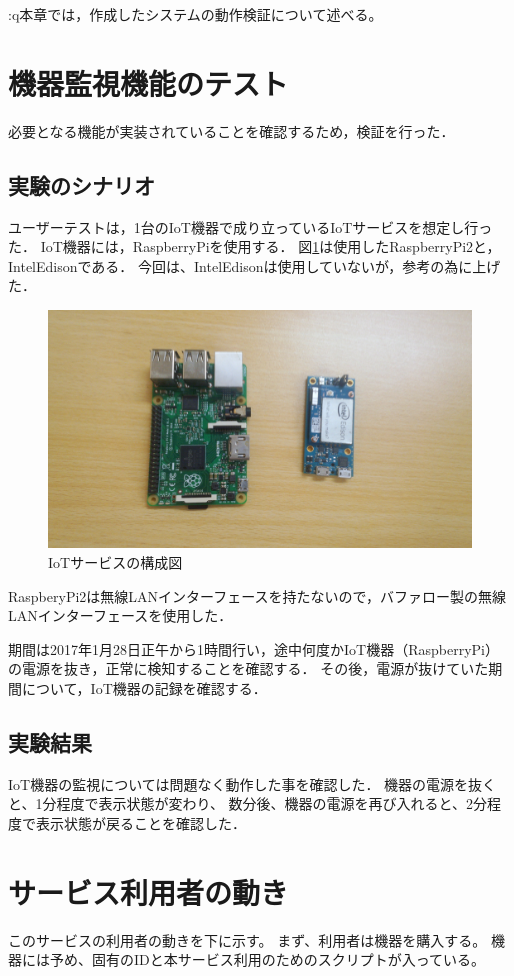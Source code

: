 :q本章では，作成したシステムの動作検証について述べる。

\section{機器監視機能のテスト}
必要となる機能が実装されていることを確認するため，検証を行った．

\subsection{実験のシナリオ}
ユーザーテストは，1台のIoT機器で成り立っているIoTサービスを想定し行った．
IoT機器には，RaspberryPiを使用する．
図\ref{fig:device}は使用したRaspberryPi2と，IntelEdisonである．
今回は、IntelEdisonは使用していないが，参考の為に上げた．
\begin{figure}[htbp]
\includegraphics[width=14cm]{images/device.png}
\caption{IoTサービスの構成図}
\label{fig:device}
\end{figure}

RaspberyPi2は無線LANインターフェースを持たないので，バファロー製の無線LANインターフェースを使用した．

期間は2017年1月28日正午から1時間行い，途中何度かIoT機器（RaspberryPi）の電源を抜き，正常に検知することを確認する．
その後，電源が抜けていた期間について，IoT機器の記録を確認する．

\subsection{実験結果}
IoT機器の監視については問題なく動作した事を確認した．
機器の電源を抜くと、1分程度で表示状態が変わり、
数分後、機器の電源を再び入れると、2分程度で表示状態が戻ることを確認した．

\section{サービス利用者の動き}
このサービスの利用者の動きを下に示す。
まず、利用者は機器を購入する。
機器には予め、固有のIDと本サービス利用のためのスクリプトが入っている。




